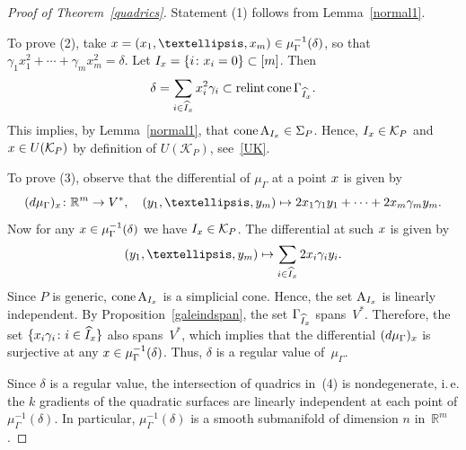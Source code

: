 \documentclass[a4paper]{amsart}
\theoremstyle{definition}
\theoremstyle{remark}
\numberwithin{equation}{section}
\def\R{\mathbb R}
\def\R{\mathbb R}
\def\sK{\mathcal K}
\newcommand{\mb}[1]{{\textbf {\textit#1}}}
\def\cone{\mathop{\mathrm{cone}}}
\def\relint{\mathop{\mathrm{relint}}}
\newcommand{\<}{\langle}
\renewcommand{\>}{\rangle}
\begin{document}
\begin{proof}[Proof of Theorem~\ref{quadrics}] Statement (1) follows from Lemma~\ref{normal1}. 

To prove (2), take $\mb x=(x_1,\ldots,x_m)\in\mu_\Gamma^{-1}(\delta)$, so that $\gamma_1 x^2_1+ 
\cdots+\gamma_mx^2_m=\delta$. Let $I_{\mb x}=\{i\colon x_i=0\}\subset[m]$. Then
\[
  \delta=\sum_{i\in\widehat I_{\mb x}}x_i^2\gamma_i\subset
  \relint\cone\Gamma_{\widehat I_{\mb x}}.
\]  
This implies, by Lemma~\ref{normal1}, that $\cone\mathrm A_{I_{\mb x}}\in\Sigma_P$. Hence, $I_{\mb x}\in\sK_P$ and $\mb x\in U(\sK_P)$ by definition of $U(\sK_P)$, see~\eqref{UK}.

\smallskip

To prove (3), observe that the differential of $\mu_\Gamma$ at a point $\mb x$ is given by
\[
  (d\mu_\Gamma)_{\mb x}\colon\R^m\to V^*,\quad
  (y_1,\ldots,y_m)\mapsto 2x_1\gamma_1y_1+\cdots+2x_m\gamma_my_m.
\]
Now for any $\mb x\in\mu_\Gamma^{-1}(\delta)$ we have $I_{\mb x}\in\sK_P$. The differential at such $\mb x$ is given by 
\[
  (y_1,\ldots,y_m)\mapsto\sum_{i\in\widehat I_{\mb x}}2x_i\gamma_iy_i.
\]
Since $P$ is generic, $\cone\mathrm A_{I_{\mb x}}$ is a simplicial cone. Hence, the set $\mathrm A_{I_{\mb x}}$ is linearly independent. By Proposition~\ref{galeindspan}, the set $\Gamma_{\widehat I_{\mb x}}$ spans~$V^*$. Therefore, the set 
$\{x_i\gamma_i\colon i\in\widehat I_{\mb x} \}$ also spans~$V^*$, which implies that the differential $(d\mu_\Gamma)_{\mb x}$ is surjective at any $\mb x\in\mu_\Gamma^{-1}(\delta)$. Thus, $\delta$ is a regular value of~$\mu_\Gamma$.

\smallskip

Since $\delta$ is a regular value, the intersection of quadrics in~(4) is nondegenerate, 
i.\,e. the $k$ gradients of the quadratic surfaces are linearly independent at each point of $\mu_\Gamma^{-1}(\delta)$. In particular, $\mu_\Gamma^{-1}(\delta)$ is a smooth submanifold of dimension $n$ in~$\R^m$. 


\end{proof}
\end{document}
